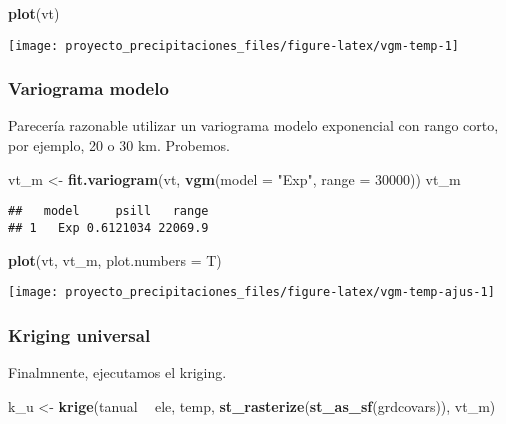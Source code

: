 \documentclass[11pt,]{article}
\newenvironment{Shaded}{\begin{snugshade}}{\end{snugshade}}
\newcommand{\KeywordTok}[1]{\textcolor[rgb]{0.13,0.29,0.53}{\textbf{#1}}}
\newcommand{\DataTypeTok}[1]{\textcolor[rgb]{0.13,0.29,0.53}{#1}}
\newcommand{\DecValTok}[1]{\textcolor[rgb]{0.00,0.00,0.81}{#1}}
\newcommand{\StringTok}[1]{\textcolor[rgb]{0.31,0.60,0.02}{#1}}
\newcommand{\OperatorTok}[1]{\textcolor[rgb]{0.81,0.36,0.00}{\textbf{#1}}}
\newcommand{\NormalTok}[1]{#1}
\begin{document}
\begin{Shaded}
\begin{Highlighting}[]
\KeywordTok{plot}\NormalTok{(vt)}
\end{Highlighting}
\end{Shaded}

\texttt{[image: proyecto\_precipitaciones\_files/figure-latex/vgm-temp-1]}

\subsubsection{Variograma modelo}\label{variograma-modelo-1}

Parecería razonable utilizar un variograma modelo exponencial con rango
corto, por ejemplo, 20 o 30 km. Probemos.

\begin{Shaded}
\begin{Highlighting}[]
\NormalTok{vt_m <-}\StringTok{ }\KeywordTok{fit.variogram}\NormalTok{(vt, }\KeywordTok{vgm}\NormalTok{(}\DataTypeTok{model =} \StringTok{"Exp"}\NormalTok{, }\DataTypeTok{range =} \DecValTok{30000}\NormalTok{))}
\NormalTok{vt_m}
\end{Highlighting}
\end{Shaded}

\begin{verbatim}
##   model     psill   range
## 1   Exp 0.6121034 22069.9
\end{verbatim}

\begin{Shaded}
\begin{Highlighting}[]
\KeywordTok{plot}\NormalTok{(vt, vt_m, }\DataTypeTok{plot.numbers =}\NormalTok{ T)}
\end{Highlighting}
\end{Shaded}

\texttt{[image: proyecto\_precipitaciones\_files/figure-latex/vgm-temp-ajus-1]}

\subsubsection{Kriging universal}\label{kriging-universal}

Finalmnente, ejecutamos el kriging.

\begin{Shaded}
\begin{Highlighting}[]
\NormalTok{k_u <-}\StringTok{ }\KeywordTok{krige}\NormalTok{(tanual }\OperatorTok{~}\StringTok{ }\NormalTok{ele, temp, }\KeywordTok{st_rasterize}\NormalTok{(}\KeywordTok{st_as_sf}\NormalTok{(grdcovars)), vt_m)}
\end{Highlighting}
\end{Shaded}
\end{document}
